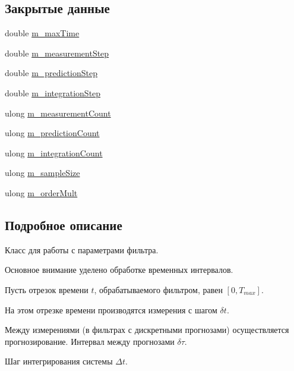 \subsection*{Закрытые данные}
\begin{DoxyCompactItemize}
\item 
double \hyperlink{class_core_1_1_filter_parameters_a5f906190ee024f4df75f8279e9986f2c}{m\+\_\+max\+Time}
\item 
double \hyperlink{class_core_1_1_filter_parameters_a68b0fe638b3a00a16cfa07f7d6a229fb}{m\+\_\+measurement\+Step}
\item 
double \hyperlink{class_core_1_1_filter_parameters_a1d15be069d981b8f7e1252cb0fd8970d}{m\+\_\+prediction\+Step}
\item 
double \hyperlink{class_core_1_1_filter_parameters_ab63c375a5b76a516da339b058af687ae}{m\+\_\+integration\+Step}
\item 
ulong \hyperlink{class_core_1_1_filter_parameters_a931e9e09796c055d6c28d7c93d3121d9}{m\+\_\+measurement\+Count}
\item 
ulong \hyperlink{class_core_1_1_filter_parameters_a6b692ee25b7554649a81c073c009855a}{m\+\_\+prediction\+Count}
\item 
ulong \hyperlink{class_core_1_1_filter_parameters_af28ca1d6c952ad42a5dfbeb6a7e916e5}{m\+\_\+integration\+Count}
\item 
ulong \hyperlink{class_core_1_1_filter_parameters_a70abc1052c13fe0fb7f971229d7a1316}{m\+\_\+sample\+Size}
\item 
ulong \hyperlink{class_core_1_1_filter_parameters_abbf3de6b71f358870d750c829d1ef4ea}{m\+\_\+order\+Mult}
\end{DoxyCompactItemize}


\subsection{Подробное описание}
Класс для работы с параметрами фильтра. 

Основное внимание уделено обработке временных интервалов.

Пусть отрезок времени $t$, обрабатываемого фильтром, равен $[0, T_{max}]$.

На этом отрезке времени производятся измерения с шагом $\delta t$.

Между измерениями (в фильтрах с дискретными прогнозами) осуществляется прогнозирование. Интервал между прогнозами $\delta \tau$.

Шаг интегрирования системы $\Delta t$.

